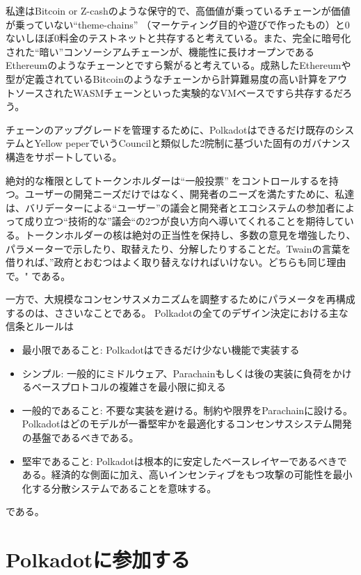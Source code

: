 私達はBitcoin or
Z-cashのような保守的で、高価値が乗っているチェーンが価値が乗っていない``theme-chains''
（マーケティング目的や遊びで作ったもの）と0ないしほぼ0料金のテストネットと共存すると考えている。また、完全に暗号化された``暗い''コンソーシアムチェーンが、機能性に長けオープンであるEthereumのようなチェーンとですら繋がると考えている。成熟したEthereumや型が定義されているBitcoinのようなチェーンから計算難易度の高い計算をアウトソースされたWASMチェーンといった実験的なVMベースですら共存するだろう。

チェーンのアップグレードを管理するために、Polkadotはできるだけ既存のシステムとYellow
peperでいうCouncilと類似した2院制に基づいた固有のガバナンス構造をサポートしている。

絶対的な権限としてトークンホルダーは``一般投票''をコントロールするを持つ。ユーザーの開発ニーズだけではなく、開発者のニーズを満たすために、私達は、バリデーターによる``ユーザー''の議会と開発者とエコシステムの参加者によって成り立つ``技術的な''議会``の2つが良い方向へ導いてくれることを期待している。トークンホルダーの核は絶対の正当性を保持し、多数の意見を増強したり、パラメーターで示したり、取替えたり、分解したりすることだ。Twainの言葉を借りれば、''政府とおむつはよく取り替えなければいけない。どちらも同じ理由で。"
である。

一方で、大規模なコンセンサスメカニズムを調整するためにパラメータを再構成するのは、ささいなことである。
Polkadotの全てのデザイン決定における主な信条とルールは

\begin{itemize}
\item
  最小限であること: Polkadotはできるだけ少ない機能で実装する
\item
  シンプル:
  一般的にミドルウェア、Parachainもしくは後の実装に負荷をかけるベースプロトコルの複雑さを最小限に抑える
\item
  一般的であること:
  不要な実装を避ける。制約や限界をParachainに設ける。Polkadotはどのモデルが一番堅牢かを最適化するコンセンサスシステム開発の基盤であるべきである。
\item
  堅牢であること:
  Polkadotは根本的に安定したベースレイヤーであるべきである。経済的な側面に加え、高いインセンティブをもつ攻撃の可能性を最小化する分散システムであることを意味する。
\end{itemize}

である。

\hypertarget{polkadotux306bux53c2ux52a0ux3059ux308b}{%
\section{Polkadotに参加する}\label{polkadotux306bux53c2ux52a0ux3059ux308b}}

